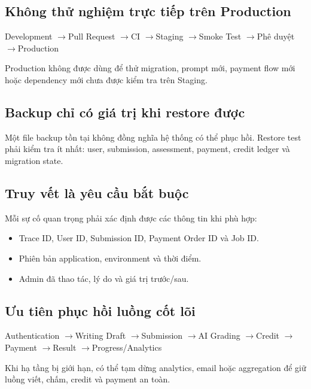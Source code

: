 \documentclass[11pt,a4paper]{article}
\newcommand{\arrow}{\ensuremath{\rightarrow}}
\begin{document}
\subsection{Không thử nghiệm trực tiếp trên Production}

\begin{flowbox}
Development \arrow Pull Request \arrow CI \arrow Staging \arrow Smoke Test \arrow Phê duyệt \arrow Production
\end{flowbox}

Production không được dùng để thử migration, prompt mới, payment flow mới hoặc dependency mới chưa được kiểm tra trên Staging.

\subsection{Backup chỉ có giá trị khi restore được}

Một file backup tồn tại không đồng nghĩa hệ thống có thể phục hồi. Restore test phải kiểm tra ít nhất: user, submission, assessment, payment, credit ledger và migration state.

\subsection{Truy vết là yêu cầu bắt buộc}

Mỗi sự cố quan trọng phải xác định được các thông tin khi phù hợp:

\begin{itemize}
  \item Trace ID, User ID, Submission ID, Payment Order ID và Job ID.
  \item Phiên bản application, environment và thời điểm.
  \item Admin đã thao tác, lý do và giá trị trước/sau.
\end{itemize}

\subsection{Ưu tiên phục hồi luồng cốt lõi}

\begin{flowbox}
Authentication \arrow Writing Draft \arrow Submission \arrow AI Grading \arrow Credit \arrow Payment \arrow Result \arrow Progress/Analytics
\end{flowbox}

Khi hạ tầng bị giới hạn, có thể tạm dừng analytics, email hoặc aggregation để giữ luồng viết, chấm, credit và payment an toàn.
\end{document}

